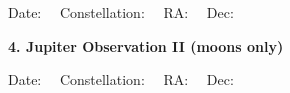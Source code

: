Date: \makebox[2cm]{\hrulefill} \ \ 
Constellation: \makebox[2cm]{\hrulefill} \ \ 
RA: \makebox[2cm]{\hrulefill} \ \ 
Dec: \makebox[2cm]{\hrulefill} \ \ 

\vspace{3.0cm}


\begin{figure}[h]
\centerline{}

\vspace{3.0cm}

\centerline{}

\end{figure}
 \vspace{1.0cm}
\bigskip\bigskip\bigskip

\newpage
\noindent
{\bf 4. Jupiter Observation II (moons only)}
\bigskip\bigskip
\noindent

Date: \makebox[2cm]{\hrulefill} \ \ 
Constellation: \makebox[2cm]{\hrulefill} \ \ 
RA: \makebox[2cm]{\hrulefill} \ \ 
Dec: \makebox[2cm]{\hrulefill} \ \ 

\vspace{3.0cm}


\begin{figure}[h]
\centerline{}

\vspace{1.0cm}


\end{figure}

